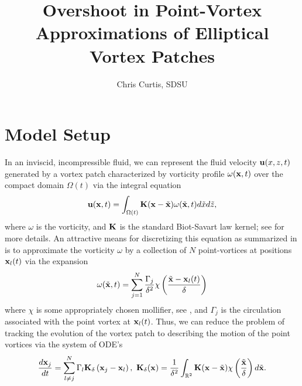 \documentclass[a4paper,11pt]{article}
\title{Overshoot in Point-Vortex Approximations of Elliptical Vortex Patches}
\author{Chris Curtis, SDSU}
\date{}
\begin{document}
\maketitle
\section*{Model Setup}
In an inviscid, incompressible fluid, we can represent the fluid velocity ${\bf u}(x,z,t)$ generated by a vortex patch characterized by vorticity profile $\omega({\bf x},t)$ over the compact domain $\Omega(t)$ via the integral equation
\[
{\bf u}({\bf x},t) = \int_{\Omega(t)} {\bf K}({\bf x}-\tilde{{\bf x}})\omega(\tilde{{\bf x}},t)d\tilde{x}d\tilde{z},
\]
where $\omega$ is the vorticity, and ${\bf K}$ is the standard Biot-Savart law kernel; see \cite{saffman} for more details.  An attractive means for discretizing this equation as summarized in \cite{cottet} is to approximate the vorticity $\omega$ by a collection of $N$ point-vortices at positions ${\bf x}_{l}(t)$ via the expansion
\begin{equation}
\omega(\tilde{{\bf x}},t) = \sum_{j=1}^{N} \frac{\Gamma_{j}}{\delta^{2}}\chi\left(\frac{\tilde{{\bf x}}-{\bf x}_{l}(t)}{\delta}\right)
\label{discvort} 
\end{equation}
where $\chi$ is some appropriately chosen mollifier, see \cite{beale}, and $\Gamma_{j}$ is the circulation associated with the point vortex at ${\bf x}_{l}(t)$.  Thus, we can reduce the problem of tracking the evolution of the vortex patch to describing the motion of the point vortices via the system of ODE's
\[
\frac{d{\bf x}_{j}}{dt}  =  \sum_{l\neq j}^{N} \Gamma_{l} {\bf K}_{\delta}\left({\bf x}_{j}-{\bf x}_{l}\right) , ~ {\bf K}_{\delta}({\bf x}) = \frac{1}{\delta^{2}}\int_{\mathbb{R}^{2}}{\bf K}({\bf x} - \tilde{\bf x})\chi \left(\frac{\tilde{{\bf x}}}{\delta} \right) d \tilde{{\bf x}}.
\]
\end{document}
